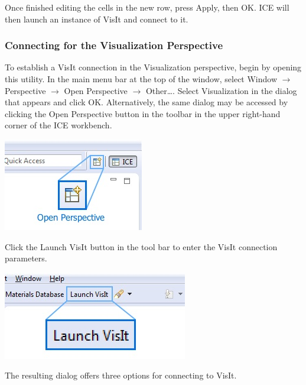 Once finished editing the cells in the new row, press Apply, then OK. ICE will
then launch an instance of VisIt and connect to it.

\subsubsection{Connecting for the Visualization Perspective} 

To establish a VisIt connection in the Visualization perspective, begin by
opening this utility. In the main menu bar at the top of the window, select
Window $\rightarrow$ Perspective $\rightarrow$ Open Perspective $\rightarrow$
Other\ldots. Select Visualization in the dialog that appears and click OK.
Alternatively, the same dialog may be accessed by clicking the Open Perspective
button in the toolbar in the upper right-hand corner of the ICE workbench.

\begin{center}
\includegraphics{images/ICE_OpenPerspective}
\end{center}

Click the Launch VisIt button in the tool bar to enter the VisIt connection
parameters.

\begin{center}
\includegraphics{images/ICE_VisItLaunchButton}
\end{center}

The resulting dialog offers three options for connecting to VisIt.

